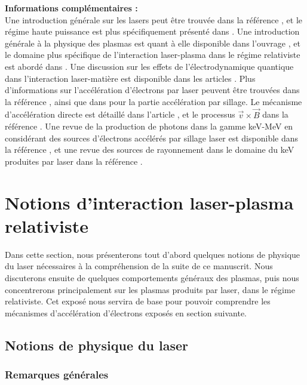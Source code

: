 \begin{refsection}
{\begin{minipage}{\textwidth}
    \medskip
    \textbf{Informations complémentaires :}\\
    Une introduction générale sur les lasers peut être trouvée dans la référence \parencite{hennequin_2013}, et le régime haute puissance est plus spécifiquement présenté dans \parencite{danson_2019}. Une introduction générale à la physique des plasmas est quant à elle disponible dans l'ouvrage \parencite{rax_2007}, et le domaine plus spécifique de l'interaction laser-plasma dans le régime relativiste est abordé dans \parencite{macchi_2012, gibbon_2013}. Une discussion sur les effets de l'électrodynamique quantique dans l'interaction laser-matière est disponible dans les articles \parencite{dipiazza_2012, zhang_2020}. Plus d'informations sur l'accélération d'électrons par laser peuvent être trouvées dans la référence \parencite{macchi_2012}, ainsi que dans \parencite{esarey_2009} pour la partie accélération par sillage. Le mécanisme d'accélération directe est détaillé dans l'article \parencite{arefiev_2016}, et le processus $\vec{v}\times\vec{B}$ dans la référence \parencite{wilks_1992}. Une revue de la production de photons dans la gamme keV-MeV en considérant des sources d'électrons accélérés par sillage laser est disponible dans la référence \parencite{albert_2016}, et une revue des sources de rayonnement dans le domaine du keV produites par laser dans la référence \parencite{corde_2013a}.
\end{minipage}}
\newpage

\section{Notions d'interaction laser-plasma relativiste}

Dans cette section, nous présenterons tout d'abord quelques notions de physique du laser nécessaires à la compréhension de la suite de ce manuscrit. Nous discuterons ensuite de quelques comportements généraux des plasmas, puis nous concentrerons principalement sur les plasmas produits par laser, dans le régime relativiste. Cet exposé nous servira de base pour pouvoir comprendre les mécanismes d'accélération d'électrons exposés en section suivante.

\subsection{Notions de physique du laser}

\subsubsection{Remarques générales}


\end{refsection}
